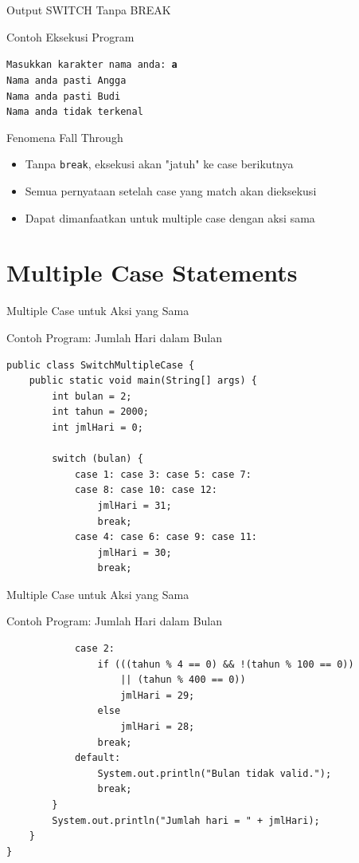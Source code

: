 \documentclass{beamer}
\begin{document}
\begin{frame}{Output SWITCH Tanpa BREAK}
\begin{block}{Contoh Eksekusi Program}
\colorbox{gray!20}{
    \parbox{0.9\textwidth}{
        \texttt{Masukkan karakter nama anda: \textbf{a}\\
        Nama anda pasti Angga\\
        Nama anda pasti Budi\\
        Nama anda tidak terkenal}
    }
}
\end{block}

\begin{block}{Fenomena Fall Through}
\begin{itemize}
\item Tanpa \texttt{break}, eksekusi akan "jatuh" ke case berikutnya
\item Semua pernyataan setelah case yang match akan dieksekusi
\item Dapat dimanfaatkan untuk multiple case dengan aksi sama
\end{itemize}
\end{block}
\end{frame} 

\section{Multiple Case Statements}
\begin{frame}[fragile]{Multiple Case untuk Aksi yang Sama}
  \begin{exampleblock}{Contoh Program: Jumlah Hari dalam Bulan}
    \begin{lstlisting}
public class SwitchMultipleCase {
    public static void main(String[] args) {
        int bulan = 2;
        int tahun = 2000;
        int jmlHari = 0;

        switch (bulan) {
            case 1: case 3: case 5: case 7: 
            case 8: case 10: case 12:
                jmlHari = 31;
                break;
            case 4: case 6: case 9: case 11:
                jmlHari = 30;
                break;
    \end{lstlisting}
  \end{exampleblock}
\end{frame}

\begin{frame}[fragile]{Multiple Case untuk Aksi yang Sama}
  \begin{exampleblock}{Contoh Program: Jumlah Hari dalam Bulan}
    \begin{lstlisting}
            case 2:
                if (((tahun % 4 == 0) && !(tahun % 100 == 0)) 
                    || (tahun % 400 == 0))
                    jmlHari = 29;
                else
                    jmlHari = 28;
                break;
            default:
                System.out.println("Bulan tidak valid.");
                break;
        }
        System.out.println("Jumlah hari = " + jmlHari);
    }
}
    \end{lstlisting}
  \end{exampleblock}
\end{frame}
\end{document}
